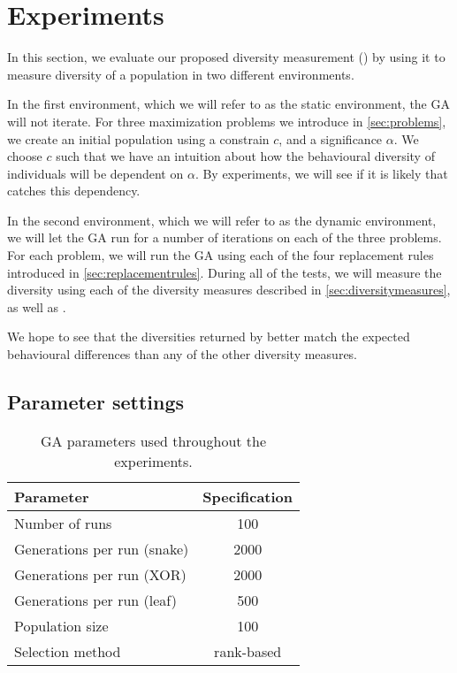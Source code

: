 \section{Experiments}
In this section, we evaluate our proposed diversity measurement (\dia) by using it to measure diversity of a population in two different environments.

In the first environment, which we will refer to as the static environment, the GA will not iterate.
For three maximization problems we introduce in \cref{sec:problems}, we create an initial population using a constrain $c$, and a significance $\alpha$. We choose $c$ such that we have an intuition about how the behavioural diversity of individuals will be dependent on $\alpha$. By experiments, we will see if it is likely that \dia{} catches this dependency.

In the second environment, which we will refer to as the dynamic environment, we will let the GA run for a number of iterations on each of the three problems. 
For each problem, we will run the GA using each of the four replacement rules introduced in \cref{sec:replacementrules}.
During all of the tests, we will measure the diversity using each of the diversity measures described in \cref{sec:diversitymeasures}, as well as \dia.

We hope to see that the diversities returned by \dia{} better match the expected behavioural differences than any of the other diversity measures.

\subsection{Parameter settings}

\begin{table}
  \centering
  \begin{tabular}{l S}
    \toprule
    Parameter & {Specification} \\
    \midrule
    Number of runs & 100 \\
    Generations per run (snake) & 2000 \\
    Generations per run (XOR) & 2000 \\
    Generations per run (leaf) & 500 \\
    Population size & 100 \\
    Selection method & {rank-based} \\
    \bottomrule
  \end{tabular}
  \caption{GA parameters used throughout the experiments.}
  \label{tab:gaparam}
\end{table}

